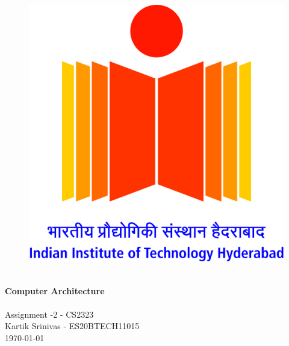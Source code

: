 \begin{titlepage}
    \vbox{ }

    \vbox{ }

    \begin{center}
        \begin{figure}
            \centering
            \includegraphics[scale=0.1]{img/logo.jpg}
            \label{fig:my_label}
        \end{figure}
        

        \noindent\makebox[\linewidth]{\rule{.7\paperwidth}{.6pt}}\\[0.7cm]
        { \huge \bfseries Computer Architecture}\\[0.25cm]
        \noindent\makebox[\linewidth]{\rule{.7\paperwidth}{.6pt}}\\[0.7cm]
        \large{Assignment -2 - CS2323}\\[1.2cm]
        \vfill
        \large
        Kartik Srinivas - ES20BTECH11015\\
            {\large \today}
    \end{center}
\end{titlepage}